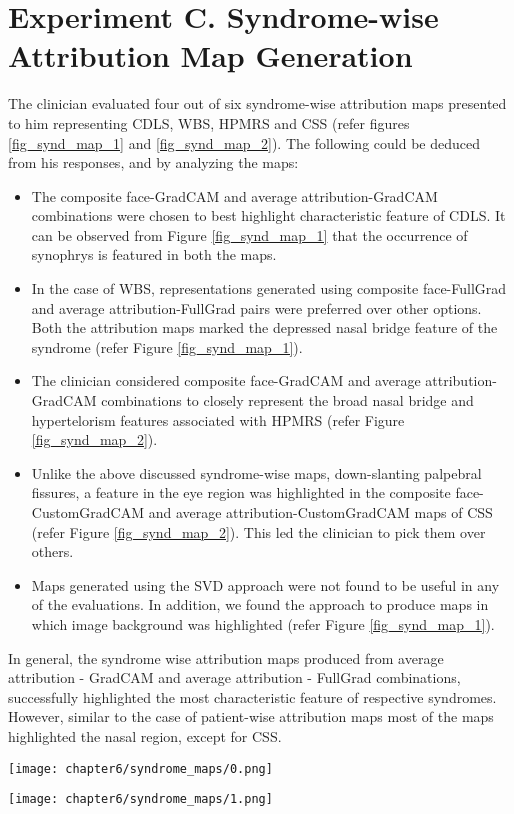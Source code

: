 \documentclass[../report.tex]{subfiles}
\begin{document}
  	\section{Experiment C. Syndrome-wise Attribution Map Generation}
    The clinician evaluated four out of six syndrome-wise attribution maps presented to him representing CDLS, WBS, HPMRS and CSS (refer figures \ref{fig_synd_map_1} and \ref{fig_synd_map_2}). The following could be deduced from his responses, and by analyzing the maps:
    \begin{itemize}
    	\item The composite face-GradCAM and average attribution-GradCAM combinations were chosen to best highlight characteristic feature of CDLS. It can be observed from Figure \ref{fig_synd_map_1} that the occurrence of synophrys is featured in both the maps.
    	\item In the case of WBS, representations generated using composite face-FullGrad and average attribution-FullGrad pairs were preferred over other options. Both the attribution maps marked the depressed nasal bridge feature of the syndrome (refer Figure \ref{fig_synd_map_1}).
    	\item The clinician considered composite face-GradCAM and average attribution-GradCAM combinations to closely represent the broad nasal bridge and hypertelorism features associated with HPMRS (refer Figure \ref{fig_synd_map_2}).
    	\item Unlike the above discussed syndrome-wise maps, down-slanting palpebral fissures, a feature in the eye region was highlighted in the composite face-CustomGradCAM and average attribution-CustomGradCAM maps of CSS (refer Figure \ref{fig_synd_map_2}). This led the clinician to pick them over others.
    	\item Maps generated using the SVD approach were not found to be useful in any of the evaluations. In addition, we found the approach to produce maps in which image background was highlighted (refer Figure \ref{fig_synd_map_1}).
    \end{itemize}
	In general, the syndrome wise attribution maps produced from average attribution - GradCAM and average attribution - FullGrad combinations, successfully highlighted the most characteristic feature of respective syndromes. However, similar to the case of patient-wise attribution maps most of the maps highlighted the nasal region, except for CSS.  
    \pagebreak	
    
    \clearpage
        \begin{sidewaysfigure}
    	\texttt{[image: chapter6/syndrome\_maps/0.png]}
    	
    	\texttt{[image: chapter6/syndrome\_maps/1.png]}
    	
    	\caption[Syndrome-wise attribution maps of CDLS and WBS]{Syndrome-wise attribution maps of CDLS (top three rows) and WBS (bottom three rows). Options chosen by the clinician are boxed in black.}
    	\label{fig_synd_map_1}	
    	\end{sidewaysfigure}
    
\end{document}
